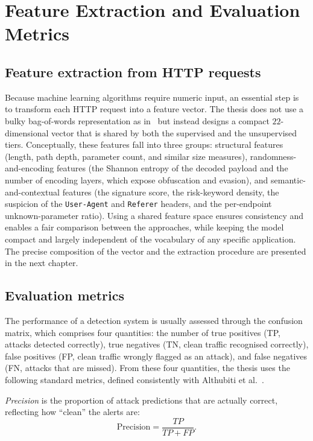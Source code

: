 \section{Feature Extraction and Evaluation Metrics}
\label{sec:features}

\subsection{Feature extraction from HTTP requests}

Because machine learning algorithms require numeric input, an essential
step is to transform each HTTP request into a feature vector. The thesis
does not use a bulky bag-of-words representation as in~\cite{pham2016} but
instead designs a compact $22$-dimensional vector that is shared by both
the supervised and the unsupervised tiers. Conceptually, these features
fall into three groups: structural features (length, path depth, parameter
count, and similar size measures), randomness-and-encoding features (the
Shannon entropy of the decoded payload and the number of encoding layers,
which expose obfuscation and evasion), and semantic-and-contextual features
(the signature score, the risk-keyword density, the suspicion of the
\texttt{User-Agent} and \texttt{Referer} headers, and the per-endpoint
unknown-parameter ratio). Using a shared feature space ensures consistency
and enables a fair comparison between the approaches, while keeping the
model compact and largely independent of the vocabulary of any specific
application. The precise composition of the vector and the extraction
procedure are presented in the next chapter.

\subsection{Evaluation metrics}

The performance of a detection system is usually assessed through the
confusion matrix, which comprises four quantities: the number of true
positives (TP, attacks detected correctly), true negatives (TN, clean
traffic recognised correctly), false positives (FP, clean traffic wrongly
flagged as an attack), and false negatives (FN, attacks that are missed).
From these four quantities, the thesis uses the following standard metrics,
defined consistently with Althubiti et al.~\cite{althubiti2017}.

\emph{Precision} is the proportion of attack predictions that are actually
correct, reflecting how ``clean'' the alerts are:
\begin{equation}
  \text{Precision} = \frac{TP}{TP + FP}.
  \label{eq:precision}
\end{equation}

